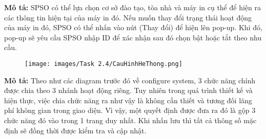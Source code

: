     \textbf{Mô tả:}
    SPSO có thể lựa chọn cơ sở đào tạo, tòa nhà và máy in cụ thể để hiện ra các thông tin hiện tại của máy in đó. Nếu muốn thay đổi trạng thái hoạt động của máy in đó, SPSO có thể nhấn vào nút (Thay đổi) để hiện lên pop-up. Khi đó, pop-up sẽ yêu cầu SPSO nhập ID để xác nhận sau đó chọn bật hoặc tắt theo nhu cầu.

    \newpage
    \begin{center}
    \begin{figure}[!htp]
    \begin{center}
     \texttt{[image: images/Task 2.4/CauHinhHeThong.png]}
    \end{center}
    \label{refhinh1}
    \end{figure}
    \end{center}

    \textbf{Mô tả:}
    Theo như các diagram trước đó về configure system, 3 chức năng chính được chia theo 3 nhánh hoạt động riêng. Tuy nhiên trong quá trình thiết kế và hiện thực, việc chia chức năng ra như vậy là không cần thiết và tương đối lãng phí không gian trong giao diện. Vì vậy, một quyết định được đưa ra đó là gộp 3 chức năng đó vào trong 1 trang duy nhất. Khi nhấn lưu thì tất cả thông số mặc định sẽ đồng thời được kiểm tra và cập nhật.\\
